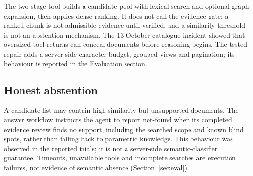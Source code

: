 The two-stage tool builds a candidate pool with lexical search and optional
graph expansion, then applies dense ranking. It does not call the
evidence gate; a ranked chunk is not admissible evidence until verified, and a
similarity threshold is not an abstention mechanism. The 13 October catalogue
incident showed that oversized tool returns can conceal documents before
reasoning begins. The tested repair adds a server-side character budget,
grouped views and pagination; its behaviour is reported in the Evaluation
section.

\subsection{Honest abstention}
A candidate list may contain high-similarity but unsupported documents. The
answer workflow instructs the agent to report not-found when its completed
evidence review finds no support, including the searched scope and known blind
spots, rather than falling back to parametric knowledge. This behaviour was
observed in the reported trials; it is not a server-side semantic-classifier
guarantee. Timeouts, unavailable tools and incomplete searches are execution
failures, not evidence of semantic absence (Section~\ref{sec:eval}).
